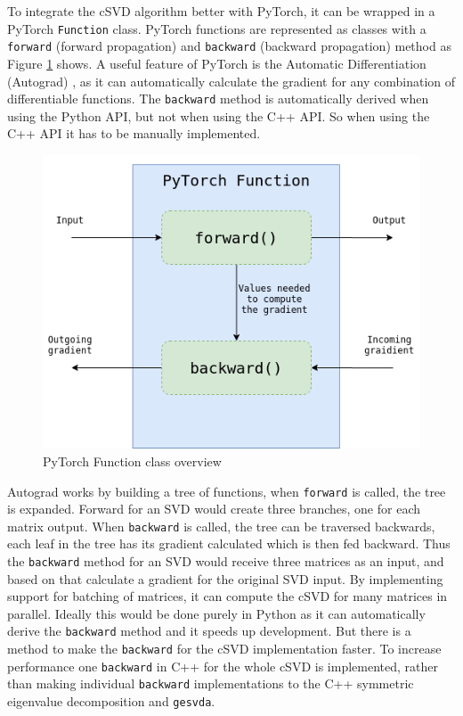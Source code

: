 To integrate the cSVD algorithm better with PyTorch, it can be wrapped in a PyTorch \texttt{Function} class. PyTorch functions are represented as classes with a \texttt{forward} (forward propagation) and \texttt{backward} (backward propagation) method as Figure \ref{fig:pytorch:function} shows. A useful feature of PyTorch is the Automatic Differentiation (Autograd) \cite{pytorch:docs}, as it can automatically calculate the gradient for any combination of differentiable functions. The \texttt{backward} method is automatically derived when using the Python API, but not when using the C++ API. So when using the C++ API it has to be manually implemented.

\begin{figure}[H]
    \centering
    \includegraphics[scale=0.45]{Figures/pytorch_function.png}
    \caption{PyTorch Function class overview}
    \label{fig:pytorch:function}
\end{figure}

Autograd works by building a tree of functions, when \texttt{forward} is called, the tree is expanded. Forward for an SVD would create three branches, one for each matrix output. When \texttt{backward} is called, the tree can be traversed backwards, each leaf in the tree has its gradient calculated which is then fed backward. Thus the \texttt{backward} method for an SVD would receive three matrices as an input, and based on that calculate a gradient for the original SVD input. By implementing support for batching of matrices, it can compute the cSVD for many matrices in parallel. Ideally this would be done purely in Python as it can automatically derive the \texttt{backward} method and it speeds up development. But there is a method to make the \texttt{backward} for the cSVD implementation faster. To increase performance one \texttt{backward} in C++ for the whole cSVD is implemented, rather than making individual \texttt{backward} implementations to the C++ symmetric eigenvalue decomposition and \texttt{gesvda}.